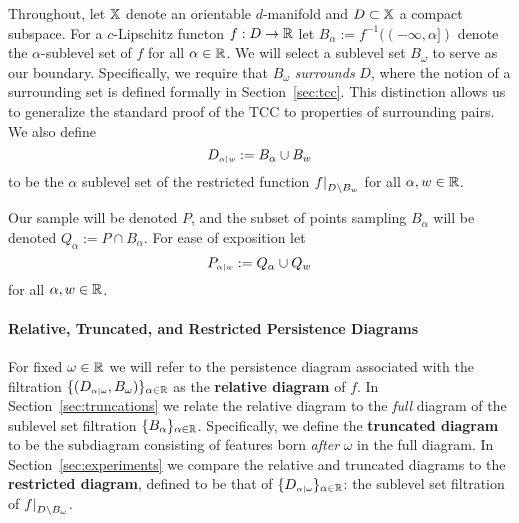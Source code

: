 
Throughout, let $\mathbb{X}$ denote an orientable $d$-manifold and $D\subset\mathbb{X}$ a compact subspace.
For a $c$-Lipschitz functon $f : D\to \mathbb{R}$ let $B_\alpha := f^{-1}((-\infty,\alpha])$ denote the $\alpha$-sublevel set of $f$ for all $\alpha\in\mathbb{R}$.
We will select a sublevel set $B_\omega$ to serve as our boundary.
Specifically, we require that $B_\omega$ \emph{surrounds} $D$, where the notion of a surrounding set is defined formally in Section~\ref{sec:tcc}.
This distinction allows us to generalize the standard proof of the TCC to properties of surrounding pairs.
We also define
\[ D_{\scriptscriptstyle \alpha\mid w} := B_\alpha\cup B_w \]
to be the $\alpha$ sublevel set of the restricted function $f\mathord{\mid}_{D\setminus B_w}$ for all $\alpha,w\in\mathbb{R}$.

Our sample will be denoted $P$, and the subset of points sampling $B_\alpha$ will be denoted $Q_\alpha := P\cap B_\alpha$.
For ease of exposition let
\[ P_{\scriptscriptstyle \alpha\mid w} := Q_\alpha\cup Q_w\]
for all $\alpha,w\in\mathbb{R}$.

\paragraph{Relative, Truncated, and Restricted Persistence Diagrams}

For fixed $\omega\in\mathbb{R}$ we will refer to the persistence diagram associated with the filtration $\{(D_{\scriptscriptstyle \alpha\mid \omega}, B_\omega)\}_{\alpha\in\mathbb{R}}$  as the \textbf{relative diagram} of $f$.
In Section~\ref{sec:truncations} we relate the relative diagram to the \emph{full} diagram of the sublevel set filtration $\{B_\alpha\}_{\alpha\in\mathbb{R}}$.
Specifically, we define the \textbf{truncated diagram} to be the subdiagram consisting of features born \emph{after} $\omega$ in the full diagram.
In Section~\ref{sec:experiments} we compare the relative and truncated diagrams to the \textbf{restricted diagram}, defined to be that of $\{D_{\scriptscriptstyle \alpha\mid \omega}\}_{\alpha\in\mathbb{R}}$: the sublevel set filtration of $f\mathord{\mid}_{D\setminus B_\omega}$.


